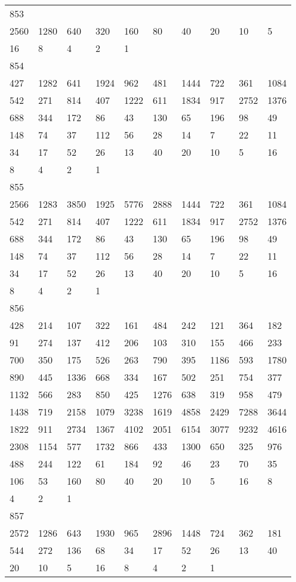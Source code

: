 \begin{longtable}{*{10}{l}}
853&&&&&&&&&\\
2560& 1280& 640& 320& 160& 80& 40& 20& 10& 5\\
16& 8& 4& 2& 1& \\

854&&&&&&&&&\\
427& 1282& 641& 1924& 962& 481& 1444& 722& 361& 1084\\
542& 271& 814& 407& 1222& 611& 1834& 917& 2752& 1376\\
688& 344& 172& 86& 43& 130& 65& 196& 98& 49\\
148& 74& 37& 112& 56& 28& 14& 7& 22& 11\\
34& 17& 52& 26& 13& 40& 20& 10& 5& 16\\
8& 4& 2& 1& \\

855&&&&&&&&&\\
2566& 1283& 3850& 1925& 5776& 2888& 1444& 722& 361& 1084\\
542& 271& 814& 407& 1222& 611& 1834& 917& 2752& 1376\\
688& 344& 172& 86& 43& 130& 65& 196& 98& 49\\
148& 74& 37& 112& 56& 28& 14& 7& 22& 11\\
34& 17& 52& 26& 13& 40& 20& 10& 5& 16\\
8& 4& 2& 1& \\

856&&&&&&&&&\\
428& 214& 107& 322& 161& 484& 242& 121& 364& 182\\
91& 274& 137& 412& 206& 103& 310& 155& 466& 233\\
700& 350& 175& 526& 263& 790& 395& 1186& 593& 1780\\
890& 445& 1336& 668& 334& 167& 502& 251& 754& 377\\
1132& 566& 283& 850& 425& 1276& 638& 319& 958& 479\\
1438& 719& 2158& 1079& 3238& 1619& 4858& 2429& 7288& 3644\\
1822& 911& 2734& 1367& 4102& 2051& 6154& 3077& 9232& 4616\\
2308& 1154& 577& 1732& 866& 433& 1300& 650& 325& 976\\
488& 244& 122& 61& 184& 92& 46& 23& 70& 35\\
106& 53& 160& 80& 40& 20& 10& 5& 16& 8\\
4& 2& 1& \\

857&&&&&&&&&\\
2572& 1286& 643& 1930& 965& 2896& 1448& 724& 362& 181\\
544& 272& 136& 68& 34& 17& 52& 26& 13& 40\\
20& 10& 5& 16& 8& 4& 2& 1& \\


\end{longtable}
